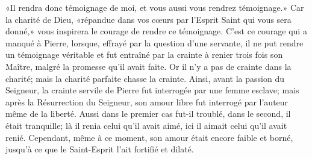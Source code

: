 «Il rendra donc témoignage de moi, et vous aussi vous rendrez témoignage.»
Car la charité de Dieu,
	«répandue dans vos cœurs par l’Esprit Saint qui vous sera donné,»
	vous inspirera le courage de rendre ce témoignage.
C’est ce courage qui a manqué à Pierre,
	lorsque, effrayé par la question d’une servante,
	il ne put rendre un témoignage véritable
	et fut entraîné par la crainte à renier trois fois son Maître,
	malgré la promesse qu’il avait faite.
Or il n’y a pas de crainte dans la charité;
	mais la charité parfaite chasse la crainte.
Ainsi, avant la passion du Seigneur,
	la crainte servile de Pierre fut interrogée par une femme esclave;
	mais après la Résurrection du Seigneur,
	son amour libre fut interrogé par l’auteur même de la liberté.
Aussi dans le premier cas fut-il troublé,
	dans le second, il était tranquille;
	là il renia celui qu’il avait aimé,
	ici il aimait celui qu’il avait renié.
Cependant, même à ce moment, son amour était encore faible et borné,
	jusqu’à ce que le Saint-Esprit l’ait fortifié et dilaté.

